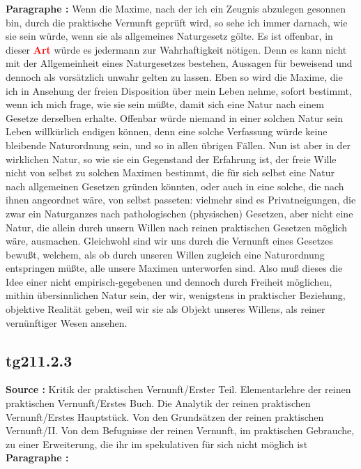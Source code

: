 \documentclass[a4paper,12pt,twoside]{book}
\newcommand{\match}[1]{\textcolor{red}{\textbf{#1}}}
\begin{document}
	\noindent\textbf{Paragraphe : }Wenn die Maxime, nach der ich ein Zeugnis abzulegen gesonnen bin, durch die praktische Vernunft geprüft wird, so sehe ich immer darnach, wie sie sein würde, wenn sie als allgemeines Naturgesetz gölte. Es ist offenbar, in dieser \match{Art} würde es jedermann zur Wahrhaftigkeit nötigen. Denn es kann nicht mit der Allgemeinheit eines Naturgesetzes bestehen, Aussagen für beweisend und dennoch als vorsätzlich unwahr gelten zu lassen. Eben so wird die Maxime, die ich in Ansehung der freien Disposition über mein Leben nehme, sofort bestimmt, wenn ich mich frage, wie sie sein müßte, damit sich eine Natur nach einem Gesetze derselben erhalte. Offenbar würde niemand in einer solchen Natur sein Leben willkürlich endigen können, denn eine solche Verfassung würde keine bleibende Naturordnung sein, und so in allen übrigen Fällen. Nun ist aber in der wirklichen Natur,  so wie sie ein Gegenstand der Erfahrung ist, der freie Wille nicht von selbst zu solchen Maximen bestimmt, die für sich selbst eine Natur nach allgemeinen Gesetzen gründen könnten, oder auch in eine solche, die nach ihnen angeordnet wäre, von selbst passeten: vielmehr sind es Privatneigungen, die zwar ein Naturganzes nach pathologischen (physischen) Gesetzen, aber nicht eine Natur, die allein durch unsern Willen nach reinen praktischen Gesetzen möglich wäre, ausmachen. Gleichwohl sind wir uns durch die Vernunft eines Gesetzes bewußt, welchem, als ob durch unseren Willen zugleich eine Naturordnung entspringen müßte, alle unsere Maximen unterworfen sind. Also muß dieses die Idee einer nicht empirisch-gegebenen und dennoch durch Freiheit möglichen, mithin übersinnlichen Natur sein, der wir, wenigstens in praktischer Beziehung, objektive Realität geben, weil wir sie als Objekt unseres Willens, als reiner vernünftiger Wesen ansehen. 
	
	\subsection*{tg211.2.3} 
	\textbf{Source : }Kritik der praktischen Vernunft/Erster Teil. Elementarlehre der reinen praktischen Vernunft/Erstes Buch. Die Analytik der reinen praktischen Vernunft/Erstes Hauptstück. Von den Grundsätzen der reinen praktischen Vernunft/II. Von dem Befugnisse der reinen Vernunft, im praktischen Gebrauche, zu einer Erweiterung, die ihr im spekulativen für sich nicht möglich ist\\  
	
	\noindent\textbf{Paragraphe : }
	
\end{document}
